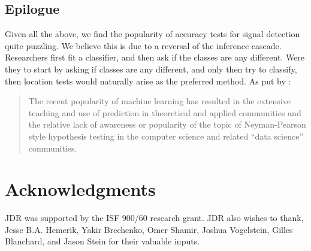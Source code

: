 \documentclass[12pt,a4paper]{article}
\begin{document}
\subsection{Epilogue}
Given all the above, we find the popularity of accuracy tests for signal detection quite puzzling. 
We believe this is due to a reversal of the inference cascade. 
Researchers first fit a classifier, and then ask if the classes are any different.
Were they to start by asking if classes are any different, and only then try to classify, then location tests would naturally arise as the preferred method. 
As put by \cite{ramdas_classification_2016}:
\begin{quote}
The recent popularity of machine learning has resulted in the extensive teaching and use
of prediction in theoretical and applied communities and the relative lack of awareness or
popularity of the topic of Neyman-Pearson style hypothesis testing in the computer science
and related ``data science'' communities.
\end{quote}






\section*{Acknowledgments}
JDR was supported by the ISF 900/60 research grant. 
JDR also wishes to thank, Jesse B.A. Hemerik, Yakir Brechenko, Omer Shamir, Joshua Vogelstein, Gilles Blanchard, and Jason Stein for their valuable inputs. 




\newpage


\end{document}
